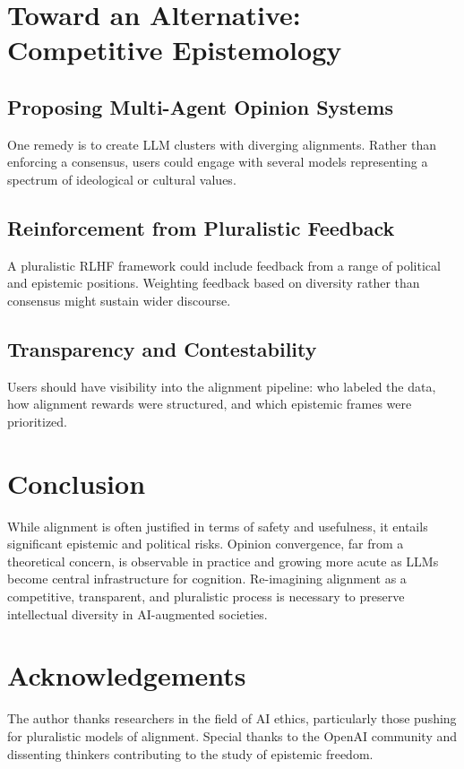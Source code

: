 \documentclass[11pt]{article}
\begin{document}
\section{Toward an Alternative: Competitive Epistemology}

\subsection{Proposing Multi-Agent Opinion Systems}
One remedy is to create LLM clusters with diverging alignments. Rather than enforcing a consensus, users could engage with several models representing a spectrum of ideological or cultural values.

\subsection{Reinforcement from Pluralistic Feedback}
A pluralistic RLHF framework could include feedback from a range of political and epistemic positions. Weighting feedback based on diversity rather than consensus might sustain wider discourse.

\subsection{Transparency and Contestability}
Users should have visibility into the alignment pipeline: who labeled the data, how alignment rewards were structured, and which epistemic frames were prioritized.

\section{Conclusion}

While alignment is often justified in terms of safety and usefulness, it entails significant epistemic and political risks. Opinion convergence, far from a theoretical concern, is observable in practice and growing more acute as LLMs become central infrastructure for cognition. Re-imagining alignment as a competitive, transparent, and pluralistic process is necessary to preserve intellectual diversity in AI-augmented societies.

\section*{Acknowledgements}
The author thanks researchers in the field of AI ethics, particularly those pushing for pluralistic models of alignment. Special thanks to the OpenAI community and dissenting thinkers contributing to the study of epistemic freedom.
\end{document}
